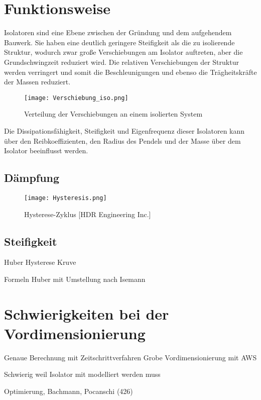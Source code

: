 \section{Funktionsweise}
\label{sec:funktion}

Isolatoren sind eine Ebene zwischen der Gründung und dem aufgehendem Bauwerk. Sie haben eine deutlich geringere Steifigkeit als die zu isolierende Struktur, wodurch zwar große Verschiebungen am Isolator auftreten, aber die Grundschwingzeit reduziert wird.
Die relativen Verschiebungen der Struktur werden verringert und somit die Beschleunigungen und ebenso die Trägheitskräfte der Massen reduziert.

\begin{figure}[h]
    \centering
    \texttt{[image: Verschiebung\_iso.png]}
    \caption{Verteilung der Verschiebungen an einem isolierten System \cite{Kelly}}
\end{figure}

Die Dissipationsfähigkeit, Steifigkeit und Eigenfrequenz dieser Isolatoren kann über den Reibkoeffizienten, den Radius des Pendels und der Masse über dem Isolator beeinflusst werden.

\subsection{Dämpfung}
\label{sec:daempdung}


\begin{figure}[h]
    \centering
    \texttt{[image: Hysteresis.png]}
    \caption{Hysterese-Zyklus [HDR Engineering Inc.]}
\end{figure}


\subsection{Steifigkeit}
\label{sec:steifigkeit}



Huber Hysterese Kruve 

Formeln Huber mit Umstellung nach Isemann

\pagebreak

\section{Schwierigkeiten bei der Vordimensionierung}
\label{sec:schwierigkeitenvordimensionierung}

Genaue Berechnung mit Zeitschrittverfahren
Grobe Vordimensionierung mit AWS

Schwierig weil Isolator mit modelliert werden muss


Optimierung, Bachmann, Pocanschi (426)

\pagebreak